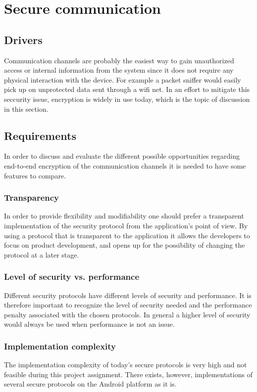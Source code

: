 \section{Secure communication}

\subsection{Drivers}
Communication channels are probably the easiest way to gain unauthorized access or internal information from the system since it does not require any physical interaction with the device.  For example a packet sniffer would easily pick up on unprotected data sent through a wifi net. In an effort to mitigate this seccurity issue, encryption is widely in use today, which is the topic of discussion in this section.

\subsection{Requirements}
In order to discuss and evaluate the different possible opportunities regarding end-to-end encryption of the communication channels it is needed to have some features to compare.

\subsubsection{Transparency}
In order to provide flexibility and modifiability one should prefer a transparent implementation of the security protocol from the application’s point of view. By using a protocol that is transparent to the application it allows the developers to focus on product development, and opens up for the possibility of changing the protocol at a later stage.

\subsubsection{Level of security vs. performance}
Different security protocols have different levels of security and performance. It is therefore important to recognize the level of security needed and the performance penalty associated with the chosen protocols. In general a higher level of security would always be used when performance is not an issue.

\subsubsection{Implementation complexity}
The implementation complexity of today's secure protocols is very high and not feasible during this project assignment. There exists, however, implementations of several secure protocols on the Android platform as it is. 

